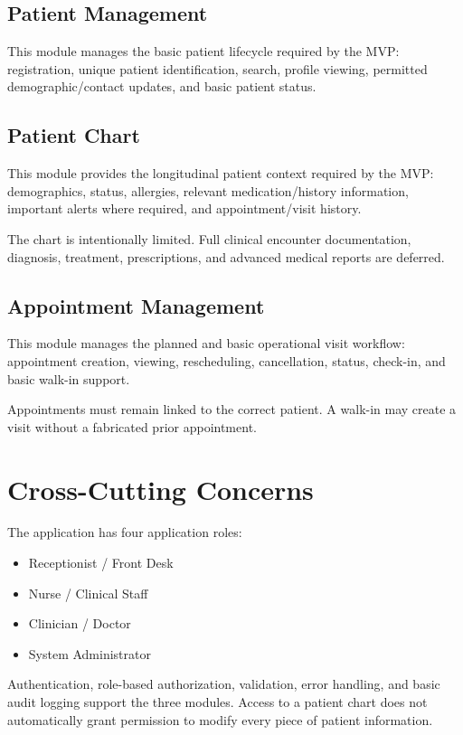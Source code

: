 \documentclass[11pt,a4paper]{article}
\begin{document}
\subsection{Patient Management}
This module manages the basic patient lifecycle required by the MVP: registration, unique patient identification, search, profile viewing, permitted demographic/contact updates, and basic patient status.

\subsection{Patient Chart}
This module provides the longitudinal patient context required by the MVP: demographics, status, allergies, relevant medication/history information, important alerts where required, and appointment/visit history.

The chart is intentionally limited. Full clinical encounter documentation, diagnosis, treatment, prescriptions, and advanced medical reports are deferred.

\subsection{Appointment Management}
This module manages the planned and basic operational visit workflow: appointment creation, viewing, rescheduling, cancellation, status, check-in, and basic walk-in support.

Appointments must remain linked to the correct patient. A walk-in may create a visit without a fabricated prior appointment.

\section{Cross-Cutting Concerns}
The application has four application roles:
\begin{itemize}
    \item Receptionist / Front Desk
    \item Nurse / Clinical Staff
    \item Clinician / Doctor
    \item System Administrator
\end{itemize}

Authentication, role-based authorization, validation, error handling, and basic audit logging support the three modules. Access to a patient chart does not automatically grant permission to modify every piece of patient information.
\end{document}
